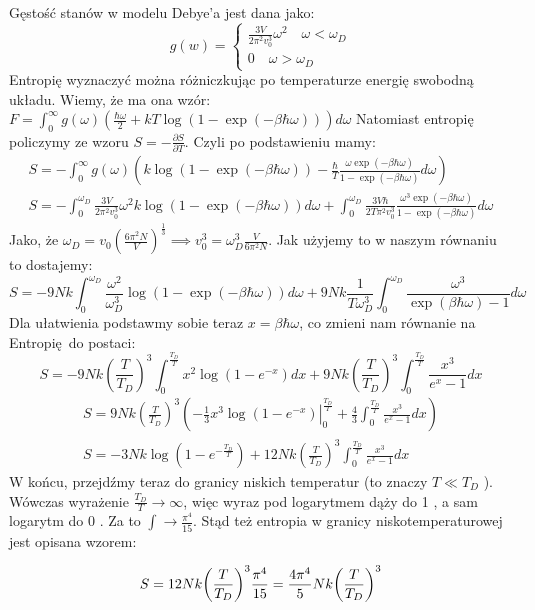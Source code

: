 \documentclass[12pt,a4paper]{article}
\begin{document}
Gęstość stanów w modelu Debye'a jest dana jako:
$$
g(w)=\left\{\begin{array}{l}
\frac{3 V}{2 \pi^{2} v_{0}^{3}} \omega^{2} \quad \omega<\omega_{D} \\
0 \quad \omega>\omega_{D}
\end{array}\right.
$$
Entropię wyznaczyć można różniczkując po temperaturze energię swobodną układu. Wiemy, że ma ona wzór:
$
F=\int_{0}^{\infty} g(\omega)\left(\frac{\hbar \omega}{2}+k T \log (1-\exp (-\beta \hbar \omega))\right) d \omega
$
Natomiast entropię policzymy ze wzoru 
$
S=-\frac{\partial S}{\partial T}
$.
Czyli po podstawieniu mamy:
$$
\begin{gathered}
S=-\int_{0}^{\infty} g(\omega)\left(k \log (1-\exp (-\beta \hbar \omega))-\frac{\hbar}{T} \frac{\omega \exp (-\beta \hbar \omega)}{1-\exp (-\beta \hbar \omega)} d \omega\right) \\
S=-\int_{0}^{\omega_{D}} \frac{3 V}{2 \pi^{2} v_{0}^{3}} \omega^{2} k \log (1-\exp (-\beta \hbar \omega)) d \omega+\int_{0}^{\omega_{D}} \frac{3 V \hbar}{2 T \pi^{2} v_{0}^{3}} \frac{\omega^{3} \exp (-\beta \hbar \omega)}{1-\exp (-\beta \hbar \omega)} d \omega
\end{gathered}
$$
Jako, że $\omega_{D}=v_{0}\left(\frac{6 \pi^{2} N}{V}\right)^{\frac{1}{3}} \implies v_{0}^{3}=\omega_{D}^{3} \frac{V}{6 \pi^{2} N}$. Jak użyjemy to w naszym równaniu to dostajemy:
$$
S=-9 N k \int_{0}^{\omega_{D}} \frac{\omega^{2}}{\omega_{D}^{3}} \log (1-\exp (-\beta \hbar \omega)) d \omega+9 N k \frac{1}{T \omega_{D}^{3}} \int_{0}^{\omega_{D}} \frac{\omega^{3}}{\exp (\beta \hbar \omega)-1} d \omega
$$
Dla ułatwienia podstawmy sobie teraz $x=\beta \hbar \omega$, co zmieni nam równanie na Entropię do postaci:
$$
S=-9 N k\left(\frac{T}{T_{D}}\right)^{3} \int_{0}^{\frac{T_{D}}{T}} x^{2} \log \left(1-e^{-x}\right) d x+9 N k\left(\frac{T}{T_{D}}\right)^{3} \int_{0}^{\frac{T_{D}}{T}} \frac{x^{3}}{e^{x}-1} d x
$$
$$
\begin{gathered}
S=9 N k\left(\frac{T}{T_{D}}\right)^{3}\left(-\left.\frac{1}{3} x^{3} \log \left(1-e^{-x}\right)\right|_{0} ^{\frac{T_{D}}{T}}+\frac{4}{3} \int_{0}^{\frac{T_{D}}{T}} \frac{x^{3}}{e^{x}-1} d x\right) \\
S=-3 N k \log \left(1-e^{-\frac{T_{D}}{T}}\right)+12 N k\left(\frac{T}{T_{D}}\right)^{3} \int_{0}^{\frac{T_{D}}{T}} \frac{x^{3}}{e^{x}-1} d x
\end{gathered}
$$
W końcu, przejdźmy teraz do granicy niskich temperatur (to znaczy $T \ll T_{D}$ ). Wówczas wyrażenie $\frac{T_{D}}{T} \rightarrow \infty$, więc wyraz pod logarytmem dąży do 1 , a sam logarytm do 0 . Za to $\int \to \frac{\pi^{4}}{15}$. Stąd też entropia w granicy niskotemperaturowej jest opisana wzorem:

\[
    S = 12 N k \qty(\frac{T}{T_D})^3 \frac{\pi^4}{15} = \frac{4 \pi^4}{5} N k \qty(\frac{T}{T_D})^3
\]
\end{document}

